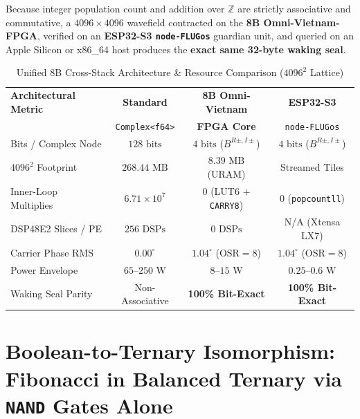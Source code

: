 \documentclass[10pt, twocolumn, a4paper]{article}
\begin{document}
Because integer population count and addition over $\mathbb{Z}$ are strictly associative and commutative, a $4096 \times 4096$ wavefield contracted on the \textbf{8B Omni-Vietnam-FPGA}, verified on an \textbf{ESP32-S3 \texttt{node-FLUGos}} guardian unit, and queried on an Apple Silicon or x86\_64 host produces the \textbf{exact same 32-byte waking seal}.

\begin{table}[h!]
\centering
\caption{Unified 8B Cross-Stack Architecture \& Resource Comparison ($4096^2$ Lattice)}
\vspace{4pt}
\scriptsize
\begin{tabular}{@{}lccc@{}}
\toprule
\textbf{Architectural Metric} & \textbf{Standard} & \textbf{8B Omni-Vietnam} & \textbf{ESP32-S3} \\
 & \texttt{Complex<f64>} & \textbf{FPGA Core} & \texttt{node-FLUGos} \\
\midrule
Bits / Complex Node & $128\text{ bits}$ & \textbf{$4\text{ bits}$} ($B^{R\pm,I\pm}$) & \textbf{$4\text{ bits}$} ($B^{R\pm,I\pm}$) \\
$4096^2$ Footprint & $268.44\text{ MB}$ & \textbf{$8.39\text{ MB}$} (URAM) & Streamed Tiles \\
Inner-Loop Multiplies & $6.71 \times 10^7$ & \textbf{$0$} (LUT6 + \texttt{CARRY8}) & \textbf{$0$} (\texttt{popcountll}) \\
DSP48E2 Slices / PE & $256\text{ DSPs}$ & \textbf{$0\text{ DSPs}$} & N/A (Xtensa LX7) \\
Carrier Phase RMS & $0.00^\circ$ & \textbf{$1.04^\circ$} ($\text{OSR}=8$) & \textbf{$1.04^\circ$} ($\text{OSR}=8$) \\
Power Envelope & $65\text{--}250\text{ W}$ & \textbf{$8\text{--}15\text{ W}$} & \textbf{$0.25\text{--}0.6\text{ W}$} \\
Waking Seal Parity & Non-Associative & \textbf{100\% Bit-Exact} & \textbf{100\% Bit-Exact} \\
\bottomrule
\end{tabular}
\label{tab:stack}
\end{table}

\section{Boolean-to-Ternary Isomorphism: Fibonacci in Balanced Ternary via \texttt{NAND} Gates Alone}
\end{document}
